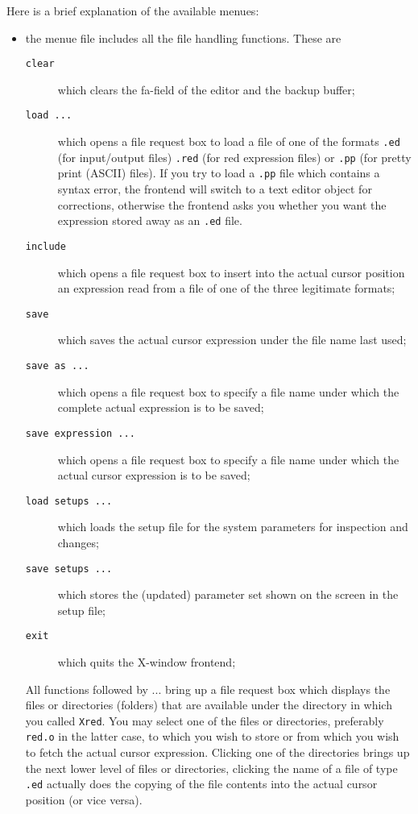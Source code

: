 Here is a brief explanation of the available menues:
\begin{itemize}
\item the menue {\sc file} includes all the file handling functions. These are
\begin{description}
\item[{\tt clear}] which clears the {\sc fa}-field of the editor and the backup buffer;
\item[{\tt load ...}] which opens a file request box to load a file of one of the formats
{\tt .ed} (for input/output files) {\tt .red} (for red expression files) or
{\tt .pp} (for pretty print (ASCII) files). If you try to load a {\tt .pp} file
which contains a syntax error, the frontend will switch to a text editor object
for corrections, otherwise the frontend asks you whether you want the expression
stored away as an {\tt .ed} file.
\item[{\tt include}] which opens a file request box to insert into the actual cursor position
an expression read from a file of one of the three legitimate formats;
\item[{\tt save}] which saves the actual cursor expression under the file name last used;
\item[{\tt save as ...}] which opens a file request box to specify a file name under which
the complete actual expression is to be saved; 
\item[{\tt save expression ...}] which opens a file request box to specify  a file name
under which the actual cursor expression is to be saved;
\item[{\tt load setups ...}] which loads the setup file for the system parameters for 
inspection and changes;
\item[{\tt save setups ...}] which stores the (updated) parameter set shown on the screen
in the setup file;
\item[{\tt exit}] which quits the X-window frontend;
\end{description} 
All functions followed by ... bring up a file request box which displays the
files or directories (folders) that are available under the directory in which you
called {\tt Xred}. You may select one of the files or directories, preferably {\tt red.o} in
the latter case,
to which you wish to store or from which you wish to  fetch the actual cursor expression.
Clicking one of the directories brings up the
next lower level of files or directories, clicking the name of a file of type
 {\tt .ed} actually does the copying of the file contents 
into the actual cursor position (or vice versa).

\end{itemize}
